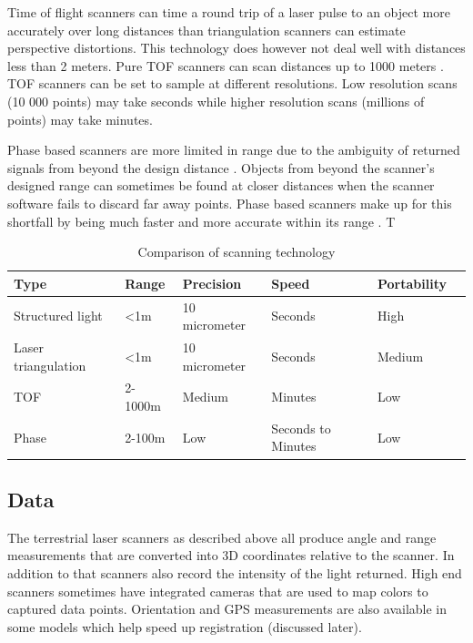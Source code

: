 Time of flight scanners can time a round trip of a laser pulse to an object more accurately over long distances than triangulation scanners can estimate perspective distortions. This technology does however not deal well with distances less than 2 meters. Pure TOF scanners can scan distances up to 1000 meters \cite{Form2014}. TOF scanners can be set to sample at different resolutions. Low resolution scans (10 000 points) may take seconds while higher resolution scans (millions of points) may take minutes.

Phase based scanners are more limited in range due to the ambiguity of returned signals from beyond the design distance \cite{Bhurtha}. Objects from beyond the scanner's designed range can sometimes be found at closer distances when the scanner software fails to discard far away points. Phase based scanners make up for this shortfall by being much faster and more accurate within its range \cite{Form2014}. T


\begin{table}
\begin{tabular}{ |l|l|l|l|l|l| }
  \hline
  Type &              Range &        Precision       & Speed & Portability \\
  \hline
  Structured light &    <1m     & 10 micrometer  & Seconds & High \\
  Laser triangulation & <1m     & 10 micrometer  & Seconds  & Medium \\     
  TOF &                 2-1000m & Medium      & Minutes & Low \\
  Phase &               2-100m & Low         & Seconds to Minutes & Low \\
  \hline  
\end{tabular}
\caption{Comparison of scanning technology}
\end{table}


\subsection{Data}

The terrestrial laser scanners as described above all produce angle and range measurements that are converted into 3D coordinates relative to the scanner. In addition to that scanners also record the intensity of the light returned. High end scanners sometimes have integrated cameras that are used to map colors to captured data points. Orientation and GPS measurements are also available in some models which help speed up registration (discussed later).


